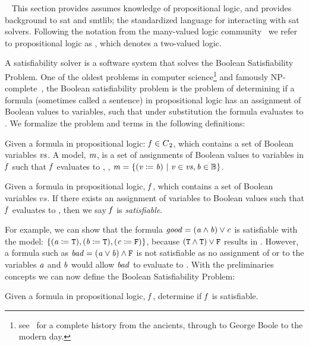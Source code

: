 ~\label{section:sat-solving}
%
This section provides assumes knowledge of propositional logic, and provides
background to \acl{sat} and \ac{smtlib}; the standardized language for
interacting with \ac{sat} solvers. Following the notation from the many-valued
logic community~\cite{Rescher1969-RESML} we refer to propositional logic as
\pl{}, which denotes a two-valued logic.

A satisfiability solver is a software system that solves the Boolean
Satisfiability Problem. One of the oldest problems in computer
science\footnote{see~\citet{BBH+09} for a complete history from the ancients,
  through to George Boole to the modern day.} and famously
NP-complete~\cite{10.1145/800157.805047}, the Boolean satisfiability problem is
the problem of determining if a formula (sometimes called a sentence) in
propositional logic has an assignment of Boolean values to variables, such that
under substitution the formula evaluates to \tru{}. We formalize the problem and
terms in the following definitions:

\begin{definition}[Model]
  Given a formula in propositional logic: $\mathit{f} \in {C\textsubscript{2}}{}$, which contains a
  set of Boolean variables $\mathit{vs}$. A model, $\mathit{m}$, is a set of assignments
  of Boolean values to variables in $\mathit{f}$ such that $\mathit{f}$ evaluates to
  \tru{}, \ie{}, $\mathit{m = \{ (v \coloneqq{} b)\ |\ v \in vs, b \in \mathbb{B}} \}$.
\end{definition}

\begin{definition}[Satisfiable]
  Given a formula in propositional logic, $\mathit{f}$, which
  contains a set of Boolean variables $vs$. If there exists an assignment of
  variables to Boolean values such that $\mathit{f}$ evaluates to \tru{}, then we
  say $\mathit{f}$ is \emph{satisfiable}.
\end{definition}

For example, we can show that the formula $\mathit{good = (a \wedge b) \vee c}$ is
satisfiable with the model: $\{\mathit{(a \coloneqq{}{} \texttt{T}{}), (b \coloneqq{}{} \texttt{T}{}),
  (c \coloneqq{}{} \texttt{F}{})}\}$, because $(\texttt{T}{} \wedge{} \texttt{T}{}) \vee{} \texttt{F}{}$
results in \tru{}. However, a formula such as $\mathit{bad = (a \vee b) \wedge
  \texttt{F}{}}$ is not satisfiable as no assignment of \fls{} or \tru{} to the
variables $\mathit{a}$ and $\mathit{b}$ would allow $\mathit{bad}$ to evaluate to \tru{}.
With the preliminaries concepts we can now define the Boolean Satisfiability
Problem:

\begin{definition}
  Given a formula in propositional logic, $\mathit{f}$, determine if $\mathit{f}$ is
  satisfiable.
\end{definition}

